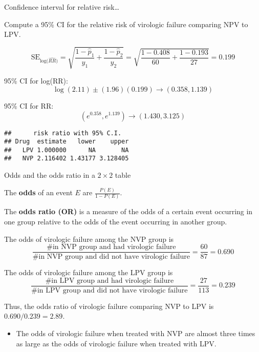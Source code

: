 \documentclass[
  ignorenonframetext,
  aspectratio=169]{beamer}
\newenvironment{Shaded}{\begin{snugshade}}{\end{snugshade}}
\newcommand{\AttributeTok}[1]{\textcolor[rgb]{0.13,0.29,0.53}{#1}}
\newcommand{\FunctionTok}[1]{\textcolor[rgb]{0.13,0.29,0.53}{\textbf{#1}}}
\newcommand{\NormalTok}[1]{#1}
\newcommand{\SpecialCharTok}[1]{\textcolor[rgb]{0.81,0.36,0.00}{\textbf{#1}}}
\newcommand{\StringTok}[1]{\textcolor[rgb]{0.31,0.60,0.02}{#1}}
\providecommand{\tightlist}{%
  \setlength{\itemsep}{0pt}\setlength{\parskip}{0pt}}
\begin{document}
\begin{frame}[fragile]{Confidence interval for relative risk\ldots{}}
\protect\hypertarget{confidence-interval-for-relative-risk-1}{}
\small

Compute a 95\% CI for the relative risk of virologic failure comparing
NPV to LPV.

\[\text{SE}_{\text{log($\widehat{RR}$)}} = \sqrt{\dfrac{1 - \hat{p}_1}{y_1} + \dfrac{1 - \hat{p}_2}{y_2}} = \sqrt{\dfrac{1 - 0.408}{60} + \dfrac{1 - 0.193}{27}} = 0.199\]

95\% CI for log(RR):
\[\log(2.11) \pm (1.96)(0.199) \rightarrow (0.358, 1.139)\]

95\% CI for RR: \[(e^{0.358}, e^{1.139}) \rightarrow (1.430, 3.125) \]

\scriptsize

\begin{Shaded}
\end{Shaded}

\begin{verbatim}
##      risk ratio with 95% C.I.
## Drug  estimate   lower    upper
##   LPV 1.000000      NA       NA
##   NVP 2.116402 1.43177 3.128405
\end{verbatim}
\end{frame}

\begin{frame}{Odds and the odds ratio in a \(2 \times 2\) table}
\protect\hypertarget{odds-and-the-odds-ratio-in-a-2-times-2-table}{}
\small

The \textbf{odds} of an event \(E\) are \(\frac{P(E)}{1 - P(E)}\).

The \textbf{odds ratio (OR)} is a measure of the odds of a certain event
occurring in one group relative to the odds of the event occurring in
another group.

The odds of virologic failure among the NVP group is
\[\dfrac{\text{\# in NVP group and had virologic failure}}{\text{\# in NVP group and did not have virologic failure}} = \dfrac{60}{87} = 0.690 \]

The odds of virologic failure among the LPV group is
\[\dfrac{\text{\# in LPV group and had virologic failure}}{\text{\# in LPV group and did not have virologic failure}} = \dfrac{27}{113} = 0.239\]

Thus, the odds ratio of virologic failure comparing NVP to LPV is
\(0.690/0.239 = 2.89\).

\begin{itemize}
\tightlist
\item
  The odds of virologic failure when treated with NVP are almost three
  times as large as the odds of virologic failure when treated with LPV.
\end{itemize}
\end{frame}
\end{document}
